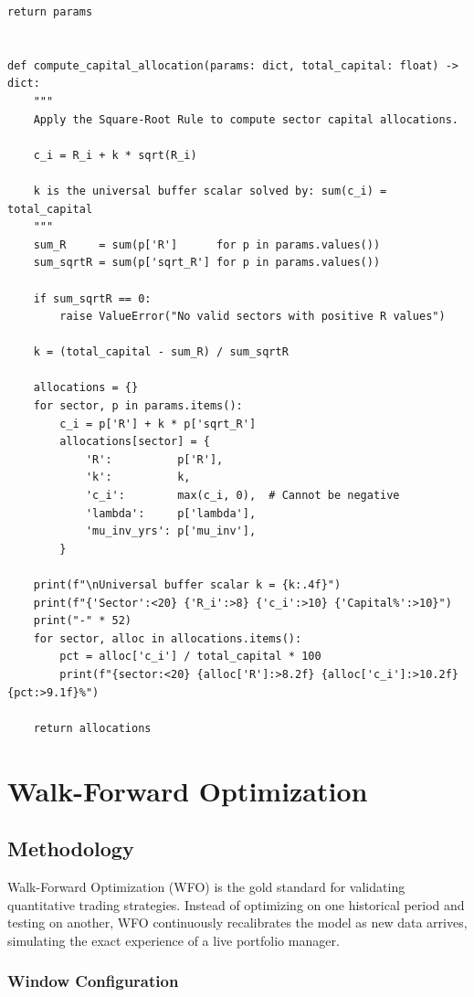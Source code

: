 \documentclass[11pt, oneside]{book}
\begin{document}
\begin{lstlisting}[style=pythonstyle, caption={M/G/Infinity Parameter Extraction}]
    return params


def compute_capital_allocation(params: dict, total_capital: float) -> dict:
    """
    Apply the Square-Root Rule to compute sector capital allocations.

    c_i = R_i + k * sqrt(R_i)

    k is the universal buffer scalar solved by: sum(c_i) = total_capital
    """
    sum_R     = sum(p['R']      for p in params.values())
    sum_sqrtR = sum(p['sqrt_R'] for p in params.values())

    if sum_sqrtR == 0:
        raise ValueError("No valid sectors with positive R values")

    k = (total_capital - sum_R) / sum_sqrtR

    allocations = {}
    for sector, p in params.items():
        c_i = p['R'] + k * p['sqrt_R']
        allocations[sector] = {
            'R':          p['R'],
            'k':          k,
            'c_i':        max(c_i, 0),  # Cannot be negative
            'lambda':     p['lambda'],
            'mu_inv_yrs': p['mu_inv'],
        }

    print(f"\nUniversal buffer scalar k = {k:.4f}")
    print(f"{'Sector':<20} {'R_i':>8} {'c_i':>10} {'Capital%':>10}")
    print("-" * 52)
    for sector, alloc in allocations.items():
        pct = alloc['c_i'] / total_capital * 100
        print(f"{sector:<20} {alloc['R']:>8.2f} {alloc['c_i']:>10.2f} {pct:>9.1f}%")

    return allocations
\end{lstlisting}

\chapter{Walk-Forward Optimization}

\section{Methodology}

Walk-Forward Optimization (WFO) is the gold standard for validating quantitative trading strategies. Instead of optimizing on one historical period and testing on another, WFO continuously recalibrates the model as new data arrives, simulating the exact experience of a live portfolio manager.

\subsection{Window Configuration}
\end{document}

